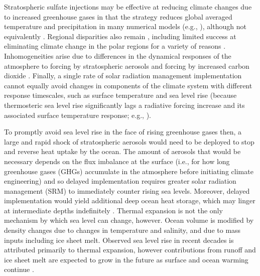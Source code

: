 \documentclass{nature}
\begin{document}
Stratospheric sulfate injections may be effective at reducing climate changes due to increased greenhouse gases in that the strategy reduces global averaged temperature and precipitation in many numerical models (e.g., \cite{kravitz13}), although not equivalently \cite{bala08}. Regional disparities also remain \cite{ricke10}, including limited success at eliminating climate change  in the polar regions for a variety of reasons \cite{mccusker12}. Inhomogeneities arise due to differences in the dynamical responses of the atmosphere to forcing by stratospheric aerosols and forcing by increased carbon dioxide \cite{ammann10,mccusker12}. Finally, a single rate of solar radiation management implementation cannot equally avoid changes in components of the climate system with different response timescales, such as surface temperature and sea level rise \cite{irvine12} (because thermosteric sea level rise significantly lags a radiative forcing increase and its associated surface temperature response; e.g., \cite{wigley06,solomon10}). 

To promptly avoid sea level rise in the face of rising greenhouse gases then, a large and rapid shock of stratospheric aerosols would need to be deployed to stop and reverse heat uptake by the ocean. The amount of aerosols that would be necessary depends on the flux imbalance at the surface (i.e., for how long greenhouse gases (GHGs) accumulate in the atmosphere before initiating climate engineering) and so delayed implementation requires greater solar radiation management (SRM) to immediately counter rising sea levels. Moreover, delayed implementation would yield additional deep ocean heat storage, which may linger at intermediate depths indefinitely \cite{gillett11}. Thermal expansion is not the only mechanism by which sea level can change, however. Ocean volume is modified by density changes due to changes in temperature and salinity, and due to mass inputs including ice sheet melt. Observed sea level rise in recent decades is attributed primarily to thermal expansion, however contributions from runoff and ice sheet melt are expected to grow in the future as surface and ocean warming continue \cite{bindoff07}. 
\end{document}

